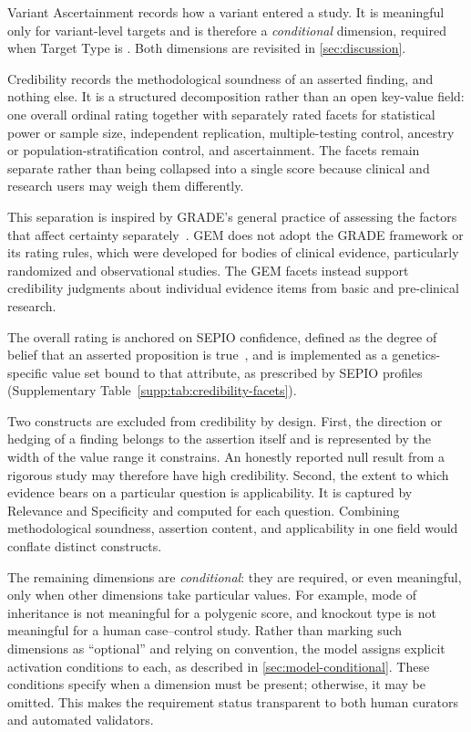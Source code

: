 Variant Ascertainment records how a variant entered a study. It is meaningful
only for variant-level targets and is therefore a \emph{conditional}
dimension, required when Target Type is . Both dimensions
are revisited in \cref{sec:discussion}.

Credibility records the methodological soundness of an asserted finding, and
nothing else. It is a structured decomposition rather than an open key-value
field: one overall ordinal rating together with separately rated facets for
statistical power or sample size, independent replication, multiple-testing
control, ancestry or population-stratification control, and ascertainment.
The facets remain separate rather than being collapsed into a single score
because clinical and research users may weigh them differently.

This separation is inspired by GRADE's general practice of assessing the
factors that affect certainty separately~\cite{grade2008}. GEM does not
adopt the GRADE framework or its rating rules, which were developed for
bodies of clinical evidence, particularly randomized and observational
studies. The GEM facets instead support credibility judgments about
individual evidence items from basic and pre-clinical research.

The overall rating is anchored on SEPIO confidence, defined as the degree of
belief that an asserted proposition is true~\cite{sepio}, and is implemented
as a genetics-specific value set bound to that attribute, as prescribed by
SEPIO profiles (Supplementary Table~\ref*{supp:tab:credibility-facets}).

Two constructs are excluded from credibility by design. First, the
direction or hedging of a finding belongs to the assertion itself and is
represented by the width of the value range it constrains. An honestly
reported null result from a rigorous study may therefore have high
credibility. Second, the extent to which evidence bears on a particular
question is applicability. It is captured by Relevance and Specificity and
computed for each question. Combining methodological soundness, assertion
content, and applicability in one field would conflate distinct constructs.

The remaining dimensions are \emph{conditional}: they are required, or
even meaningful, only when other dimensions take particular values. For
example, mode of inheritance is not meaningful for a polygenic score, and
knockout type is not meaningful for a human case--control study. Rather
than marking such dimensions as ``optional'' and relying on convention, the
model assigns explicit activation conditions to each, as described in
\cref{sec:model-conditional}. These conditions specify when a dimension
must be present; otherwise, it may be omitted. This makes the requirement
status transparent to both human curators and automated validators.

